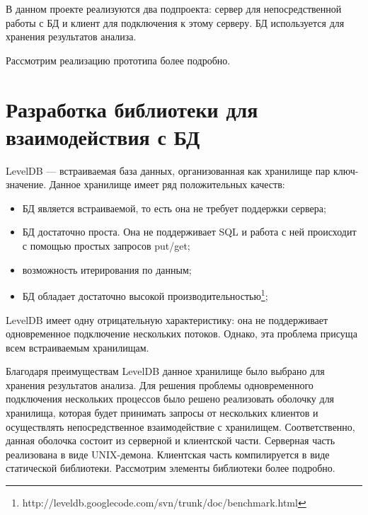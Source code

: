 В данном проекте реализуются два подпроекта: сервер для непосредственной работы с БД и клиент для подключения к этому серверу. БД используется для хранения результатов анализа.

Рассмотрим реализацию прототипа более подробно.

\section{Разработка библиотеки для взаимодействия с БД}
LevelDB --- встраиваемая база данных, организованная как хранилище пар ключ-значение. Данное хранилище имеет ряд положительных качеств:
\begin{itemize}
\item БД является встраиваемой, то есть она не требует поддержки сервера;
\item БД достаточно проста. Она не поддерживает SQL и работа с ней происходит с помощью простых запросов put/get;
\item возможность итерирования по данным;
\item БД обладает достаточно высокой производительностью\footnote{http://leveldb.googlecode.com/svn/trunk/doc/benchmark.html};
\end{itemize}

LevelDB имеет одну отрицательную характеристику: она не поддерживает одновременное подключение нескольких потоков. Однако, эта проблема присуща всем встраиваемым хранилищам.

Благодаря преимуществам LevelDB данное хранилище было выбрано для хранения результатов анализа. Для решения проблемы одновременного подключения нескольких процессов было решено реализовать оболочку для хранилища, которая будет принимать запросы от нескольких клиентов и осуществлять непосредственное взаимодействие с хранилищем. Соответственно, данная оболочка состоит из серверной и клиентской части. Серверная часть реализована в виде UNIX-демона. Клиентская часть компилируется в виде статической библиотеки. Рассмотрим элементы библиотеки более подробно.

